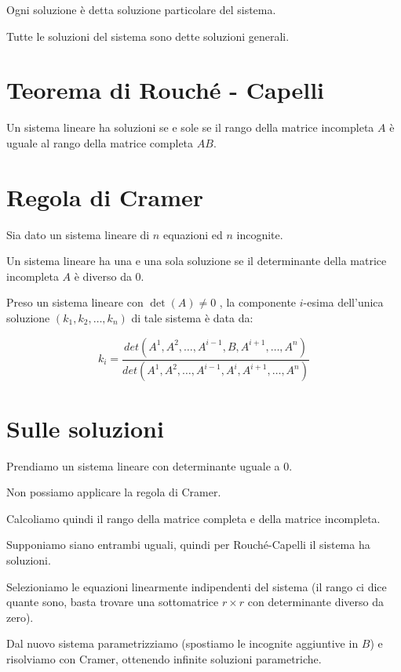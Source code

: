 \begin{definition}
Ogni soluzione è detta soluzione particolare del sistema.
\end{definition}

\begin{definition}
Tutte le soluzioni del sistema sono dette soluzioni generali.
\end{definition}

\section{Teorema di Rouché - Capelli}

\begin{theorem}
Un sistema lineare ha soluzioni se e sole se il rango della matrice incompleta $A$ è uguale al rango della matrice completa $AB$.
\end{theorem}


\section{Regola di Cramer}

Sia dato un sistema lineare di $n$ equazioni ed $n$ incognite.


\begin{theorem}
Un sistema lineare ha una e una sola soluzione se il determinante della matrice incompleta $A$ è diverso da 0.
\end{theorem}

\begin{theorem}
Preso un sistema lineare con $\det(A) \neq 0$ , la componente $i$-esima dell'unica soluzione $(k_1, k_2, \ldots, k_n)$ di tale sistema è data da:

$$k_i = \frac{det(A^1,A^2,\ldots,A^{i-1},B,A^{i+1},\ldots,A^n)}{det(A^1,A^2,\ldots,A^{i-1},A^i,A^{i+1},\ldots,A^n)}$$
\end{theorem}

\section{Sulle soluzioni}

\begin{example}
Prendiamo un sistema lineare con determinante uguale a 0.

Non possiamo applicare la regola di Cramer.

Calcoliamo quindi il rango della matrice completa e della matrice incompleta.

Supponiamo siano entrambi uguali, quindi per Rouché-Capelli il sistema ha soluzioni.

Selezioniamo le equazioni linearmente indipendenti del sistema (il rango ci dice quante sono, basta trovare una sottomatrice $r \times r$ con determinante diverso da zero).

Dal nuovo sistema parametrizziamo (spostiamo le incognite aggiuntive in $B$) e risolviamo con Cramer, ottenendo infinite soluzioni parametriche.
\end{example}


